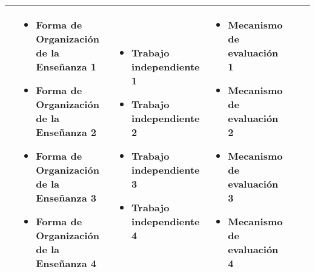 \begin{landscape}
\begin{xltabular}{\linewidth}{@{}X X X X X X@{}}
\begin{itemize}[labelsep=2pt, itemsep=0.6em]
        \end{itemize} &
        \begin{itemize}[label={}, labelsep=0pt, left=0pt .. 0pt, itemsep=1em] %
            \item Forma de Organización de la Enseñanza 1
            \item Forma de Organización de la Enseñanza 2
            \item Forma de Organización de la Enseñanza 3
            \item Forma de Organización de la Enseñanza 4
        \end{itemize}                             &
        \begin{itemize}[label={}, labelsep=0pt, left=0pt .. 0pt, itemsep=1em] %
            \item Trabajo independiente 1
            \item Trabajo independiente 2
            \item Trabajo independiente 3
            \item Trabajo independiente 4
        \end{itemize}                             &
        \begin{itemize}[label={}, labelsep=0pt, left=0pt .. 0pt, itemsep=1em] %
            \item Mecanismo de evaluación 1
            \item Mecanismo de evaluación 2
            \item Mecanismo de evaluación 3
            \item Mecanismo de evaluación 4
        \end{itemize} \\
        \bottomrule
    \end{xltabular}
\end{landscape}